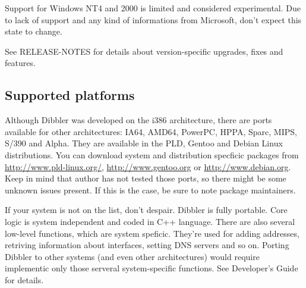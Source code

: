Support for Windows NT4 and 2000 is limited and considered
experimental. Due to lack of support and any kind of informations from
Microsoft, don't expect this state to change.

See RELEASE-NOTES for details about version-specific upgrades, fixes
and features.

\subsection{Supported platforms}
Although Dibbler was developed on the i386 architecture, there
are ports available for other architectures: IA64, AMD64, PowerPC,
HPPA, Sparc, MIPS, S/390 and Alpha. They are available in the PLD,
Gentoo and Debian Linux distributions. You can download system and
distribution specficic packages from \url{http://www.pld-linux.org/},
\url{http://www.gentoo.org} or \url{http://www.debian.org}. Keep in mind
that author has not tested those ports, so there might be some
unknown issues present. If this is the case, be sure to note package
maintainers. 

If your system is not on the list, don't despair. Dibbler is fully
portable. Core logic is system independent and coded in C++
language. There are also several low-level functions, which are system
speficic. They're used for adding addresses, retriving information about
interfaces, setting DNS servers and so on. Porting Dibbler to other
systems (and even other architectures) would require implementic only
those serveral system-specific functions. See Developer's Guide for
details.
